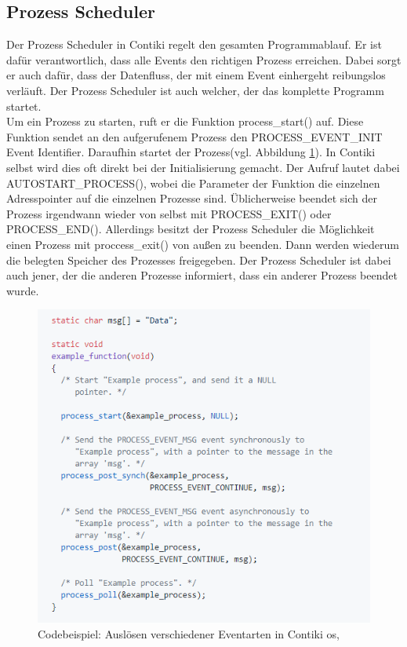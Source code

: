	\subsection{Prozess Scheduler}
	Der Prozess Scheduler in Contiki regelt den gesamten Programmablauf. Er ist dafür verantwortlich, dass alle Events den richtigen Prozess erreichen. Dabei sorgt er auch dafür, dass der Datenfluss, der mit einem Event einhergeht reibungslos verläuft. Der Prozess Scheduler ist auch welcher, der das komplette Programm startet.\\ 
	Um ein Prozess zu starten, ruft er die Funktion process\_start() auf. Diese Funktion sendet an den aufgerufenem Prozess den PROCESS\_EVENT\_INIT Event Identifier. Daraufhin startet der Prozess(vgl. Abbildung \ref{EventsContiki}). In Contiki selbst wird dies oft direkt bei der Initialisierung gemacht. Der Aufruf lautet dabei AUTOSTART\_PROCESS(), wobei die Parameter der Funktion die einzelnen Adresspointer auf die einzelnen Prozesse sind. Üblicherweise beendet sich der Prozess irgendwann wieder von selbst mit PROCESS\_EXIT() oder PROCESS\_END(). Allerdings besitzt der Prozess Scheduler die Möglichkeit einen Prozess mit proccess\_exit() von außen zu beenden. Dann werden wiederum die belegten Speicher des Prozesses freigegeben. Der Prozess Scheduler ist dabei auch jener, der die anderen Prozesse informiert, dass ein anderer Prozess beendet wurde.
	\begin{figure}
		\centering
		\includegraphics[scale=0.5]{Grafiken-Julian/ContikiEvents.png}
		\caption{Codebeispiel: Auslösen verschiedener Eventarten in Contiki \ac{os}, \cite{codebesipiel}}
		\label{EventsContiki}
	\end{figure}
